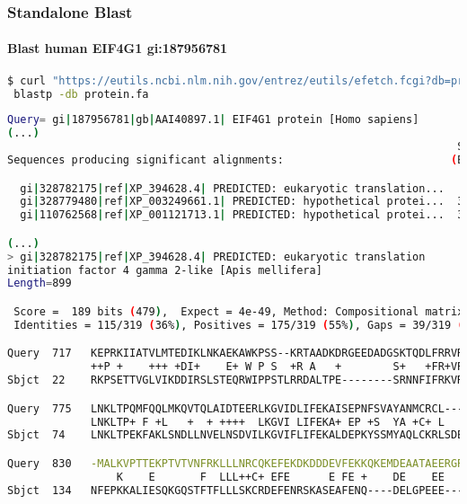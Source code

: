 \documentclass{beamer}
\begin{document}
\begin{frame}[fragile]
\frametitle{Standalone Blast}
\framesubtitle{Blast human EIF4G1 gi:187956781 }
\begin{lstlisting}[language=bash,basicstyle=\tiny,breaklines=true]
$ curl "https://eutils.ncbi.nlm.nih.gov/entrez/eutils/efetch.fcgi?db=protein&rettype=fasta&id=187956781" |\
 blastp -db protein.fa
\end{lstlisting}
\begin{lstlisting}[language=bash,basicstyle=\tiny,breaklines=false]
Query= gi|187956781|gb|AAI40897.1| EIF4G1 protein [Homo sapiens]
(...)
                                                                      Score     E
Sequences producing significant alignments:                          (Bits)  Value

  gi|328782175|ref|XP_394628.4| PREDICTED: eukaryotic translation...   189    4e-49
  gi|328779480|ref|XP_003249661.1| PREDICTED: hypothetical protei...  38.1    0.017
  gi|110762568|ref|XP_001121713.1| PREDICTED: hypothetical protei...  38.1    0.018

(...)
> gi|328782175|ref|XP_394628.4| PREDICTED: eukaryotic translation 
initiation factor 4 gamma 2-like [Apis mellifera]
Length=899

 Score =  189 bits (479),  Expect = 4e-49, Method: Compositional matrix adjust.
 Identities = 115/319 (36%), Positives = 175/319 (55%), Gaps = 39/319 (12%)

Query  717   KEPRKIIATVLMTEDIKLNKAEKAWKPSS--KRTAADKDRGEEDADGSKTQDLFRRVRSI  774
             ++P +    +++ +DI+    E+ W P S  +R A   +        S+   +FR+VR I
Sbjct  22    RKPSETTVGLVIKDDIRSLSTEQRWIPPSTLRRDALTPE--------SRNNFIFRKVRGI  73

Query  775   LNKLTPQMFQQLMKQVTQLAIDTEERLKGVIDLIFEKAISEPNFSVAYANMCRCL-----  829
             LNKLTP+ F +L   +  + ++++  LKGVI LIFEKA+ EP +S  YA +C+ L     
Sbjct  74    LNKLTPEKFAKLSNDLLNVELNSDVILKGVIFLIFEKALDEPKYSSMYAQLCKRLSDEAA  133

Query  830   -MALKVPTTEKPTVTVNFRKLLLNRCQKEFEKDKDDDEVFEKKQKEMDEAATAEERGRLK  888
                 K    E       F  LLL++C+ EFE      E FE +    DE    EE     
Sbjct  134   NFEPKKALIESQKGQSTFTFLLLSKCRDEFENRSKASEAFENQ----DELGPEEE-----  184

\end{lstlisting}
\end{frame}
\end{document}
